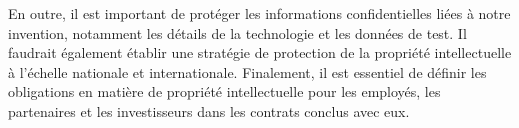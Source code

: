 \begin{itemize}
 En outre, il est important de protéger les informations confidentielles liées à notre invention, notamment les détails de la technologie et les données de test. Il faudrait également établir une stratégie de protection de la propriété intellectuelle à l'échelle nationale et internationale. Finalement, il est essentiel de définir les obligations en matière de propriété intellectuelle pour les employés, les partenaires et les investisseurs dans les contrats conclus avec eux.


\end{itemize}
